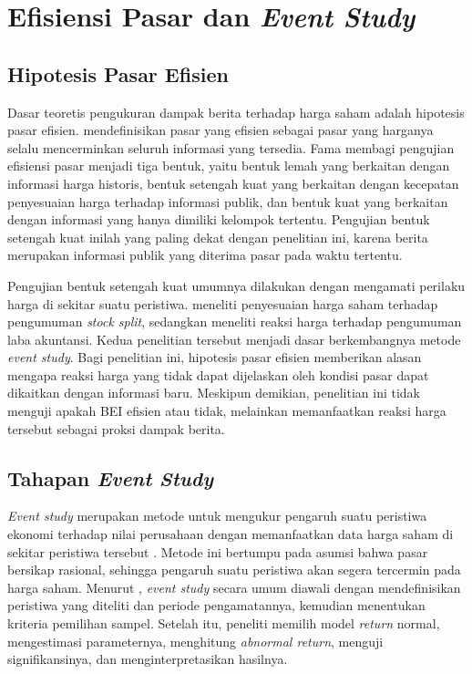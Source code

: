 \section{Efisiensi Pasar dan \emph{Event Study}}
\label{sec:event-study}

\subsection{Hipotesis Pasar Efisien}

Dasar teoretis pengukuran dampak berita terhadap harga saham adalah hipotesis pasar efisien. \textcite{fama1970} mendefinisikan pasar yang efisien sebagai pasar yang harganya selalu mencerminkan seluruh informasi yang tersedia. Fama membagi pengujian efisiensi pasar menjadi tiga bentuk, yaitu bentuk lemah yang berkaitan dengan informasi harga historis, bentuk setengah kuat yang berkaitan dengan kecepatan penyesuaian harga terhadap informasi publik, dan bentuk kuat yang berkaitan dengan informasi yang hanya dimiliki kelompok tertentu. Pengujian bentuk setengah kuat inilah yang paling dekat dengan penelitian ini, karena berita merupakan informasi publik yang diterima pasar pada waktu tertentu.

Pengujian bentuk setengah kuat umumnya dilakukan dengan mengamati perilaku harga di sekitar suatu peristiwa. \textcite{fama1969} meneliti penyesuaian harga saham terhadap pengumuman \emph{stock split}, sedangkan \textcite{ballbrown1968} meneliti reaksi harga terhadap pengumuman laba akuntansi. Kedua penelitian tersebut menjadi dasar berkembangnya metode \emph{event study}. Bagi penelitian ini, hipotesis pasar efisien memberikan alasan mengapa reaksi harga yang tidak dapat dijelaskan oleh kondisi pasar dapat dikaitkan dengan informasi baru. Meskipun demikian, penelitian ini tidak menguji apakah BEI efisien atau tidak, melainkan memanfaatkan reaksi harga tersebut sebagai proksi dampak berita.

\subsection{Tahapan \emph{Event Study}}

\emph{Event study} merupakan metode untuk mengukur pengaruh suatu peristiwa ekonomi terhadap nilai perusahaan dengan memanfaatkan data harga saham di sekitar peristiwa tersebut \autocite{mackinlay1997}. Metode ini bertumpu pada asumsi bahwa pasar bersikap rasional, sehingga pengaruh suatu peristiwa akan segera tercermin pada harga saham. Menurut \textcite{mackinlay1997}, \emph{event study} secara umum diawali dengan mendefinisikan peristiwa yang diteliti dan periode pengamatannya, kemudian menentukan kriteria pemilihan sampel. Setelah itu, peneliti memilih model \emph{return} normal, mengestimasi parameternya, menghitung \emph{abnormal return}, menguji signifikansinya, dan menginterpretasikan hasilnya.

